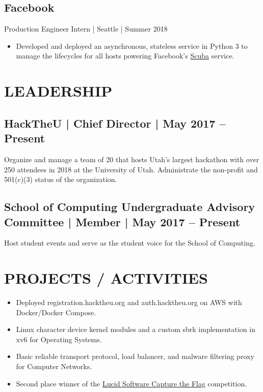 \documentclass[10pt, letterpaper]{resume}
\begin{document}
\subsection{Facebook}
Production Engineer Intern | Seattle | Summer 2018
\begin{itemize}
  \item Developed and deployed an asynchronous, stateless service in Python 3 to manage the lifecycles for all hosts powering Facebook's \href{https://research.fb.com/wp-content/uploads/2016/11/scuba-diving-into-data-at-facebook.pdf}{Scuba} service.
\end{itemize}

\section{LEADERSHIP}
\subsection{HackTheU {\normalfont | Chief Director | May 2017 -- Present}}
Organize and manage a team of 20 that hosts Utah’s largest hackathon with over 250 attendees in 2018 at the University of Utah. Administrate the non-profit and 501(c)(3) status of the organization.

\subsection{School of Computing Undergraduate Advisory Committee {\normalfont |  Member | May 2017 -- Present}}
Host student events and serve as the student voice for the School of Computing.

\section{PROJECTS / ACTIVITIES}
\begin{itemize}
  \item Deployed registration.hacktheu.org and auth.hacktheu.org on AWS with Docker/Docker Compose.
  \item Linux character device kernel modules and a custom sbrk implementation in xv6 for Operating Systems.
  \item Basic reliable transport protocol, load balancer, and malware filtering proxy for Computer Networks.
  \item Second place winner of the \href{https://github.com/lucidsoftware/ctf2019}{Lucid Software Capture the Flag} competition.
\end{itemize}
\end{document}
